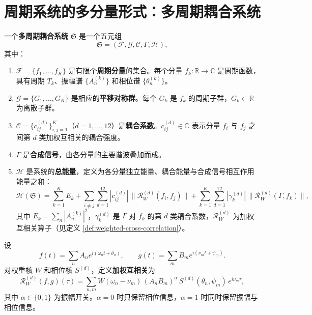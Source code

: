 \section{周期系统的多分量形式：多周期耦合系统}\label{sec:ps_phase_space}

\begin{definition}\label{def:periodic-system}
一个\textbf{多周期耦合系统} $\mathfrak{S}$ 是一个五元组
\[
\mathfrak{S}=(\mathcal{F},\mathcal{G},\mathcal{C},\Gamma,\mathcal{H}),
\]
其中：
\begin{enumerate}[label=(\roman*)]
    \item $\mathcal{F}=\{f_1,\dots,f_K\}$ 是有限个\textbf{周期分量}的集合。每个分量 $f_k:\mathbb{R}\to\mathbb{C}$ 是周期函数，具有周期 $T_k$、振幅谱 $\{A_n^{(k)}\}$ 和相位谱 $\{\theta_n^{(k)}\}$。
    \item $\mathcal{G}=\{G_1,\dots,G_K\}$ 是相应的\textbf{平移对称群}。每个 $G_k$ 是 $f_k$ 的周期子群，$G_k\subset\mathbb{R}$ 为离散子群。
    \item $\mathcal{C}=\{c_{ij}^{(d)}\}_{i,j=1}^{K}$（$d=1,\dots,12$）是\textbf{耦合系数}。$c_{ij}^{(d)}\in\mathbb{C}$ 表示分量 $f_i$ 与 $f_j$ 之间第 $d$ 类加权互相关的耦合强度。
    \item $\Gamma$ 是\textbf{合成信号}，由各分量的主要谐波叠加而成。
    \item $\mathcal{H}$ 是系统的\textbf{总能量}，定义为各分量独立能量、耦合能量与合成信号相互作用能量之和：
    \[
    \mathcal{H}(\mathfrak{S})
    =\sum_{k=1}^{K}E_k
    +\sum_{i\neq j}\sum_{d=1}^{12}|c_{ij}^{(d)}|\,\bigl\|\mathcal{R}^{(d)}_{W}(f_i,f_j)\bigr\|
    +\sum_{k=1}^{K}\sum_{d=1}^{12}|\gamma_k^{(d)}|\,\bigl\|\mathcal{R}^{(d)}_{W}(\Gamma,f_k)\bigr\|,
    \]
    其中 $E_k=\sum_n|A_n^{(k)}|^2$，$\gamma_k^{(d)}$ 是 $\Gamma$ 对 $f_k$ 的第 $d$ 类耦合系数，$\mathcal{R}^{(d)}_{W}$ 为加权互相关算子（见定义 \ref{def:weighted-cross-correlation}）。
\end{enumerate}
\end{definition}

\begin{definition}[加权互相关算子]\label{def:weighted-cross-correlation}
设
\[
f(t)=\sum_n A_n e^{i(\omega_n t+\theta_n)},\qquad
g(t)=\sum_m B_m e^{i(\nu_m t+\psi_m)}.
\]
对权重核 $W$ 和相位核 $S^{(d)}$，定义\textbf{加权互相关}为
\[
\mathcal{R}^{(d)}_{W}(f,g)(\tau)
=\sum_{n,m}W(\omega_n-\nu_m)\,(A_nB_m)^{\alpha}\,
S^{(d)}(\theta_n,\psi_m)\,e^{i\nu_m\tau},
\]
其中 $\alpha\in\{0,1\}$ 为振幅开关。$\alpha=0$ 时只保留相位信息，$\alpha=1$ 时同时保留振幅与相位信息。
\end{definition}

